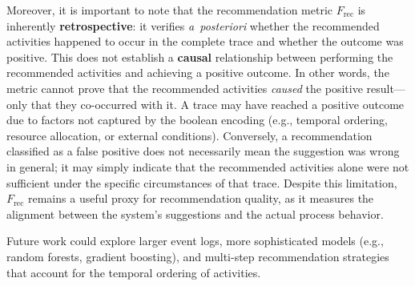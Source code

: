 \documentclass{article}
\begin{document}
\medskip
\noindent
Moreover, it is important to note that the recommendation metric $F_{\text{rec}}$ is inherently \textbf{retrospective}: it verifies \textit{a~posteriori} whether the recommended activities happened to occur in the complete trace and whether the outcome was positive. This does not establish a \textbf{causal} relationship between performing the recommended activities and achieving a positive outcome. In other words, the metric cannot prove that the recommended activities \textit{caused} the positive result---only that they co-occurred with it. A trace may have reached a positive outcome due to factors not captured by the boolean encoding (e.g., temporal ordering, resource allocation, or external conditions). Conversely, a recommendation classified as a false positive does not necessarily mean the suggestion was wrong in general; it may simply indicate that the recommended activities alone were not sufficient under the specific circumstances of that trace. Despite this limitation, $F_{\text{rec}}$ remains a useful proxy for recommendation quality, as it measures the alignment between the system's suggestions and the actual process behavior.

\medskip
\noindent
Future work could explore larger event logs, more sophisticated models (e.g., random forests, gradient boosting), and multi-step recommendation strategies that account for the temporal ordering of activities.
\end{document}
